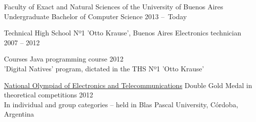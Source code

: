 \documentclass[10pt,a4paper]{article}
\begin{document}
\spacedhrule{0.3em}{-0.4em} %




\vspace{0.2em}
\headedsection
  { Faculty of Exact and Natural Sciences of the University of Buenos Aires }
  { \textsc{} } {%
  \headedsubsection
    { Undergraduate Bachelor of Computer Science }
    { 2013 --\ Today \ }{ }
}

\vspace{0.2em}
\headedsection
  { Technical High School Nº1 'Otto Krause', Buenos Aires }
  { \textsc{} } {%
  \headedsubsection
    { Electronics technician }
    { 2007 -- 2012 } {}
}


\vspace{0.2em}

\headedsection
  { Courses }
  { \textsc{} } {%
  \headedsubsection
    { Java programming course }
    { 2012 }{ \\ 'Digital Natives' program, dictated in the THS Nº1 'Otto Krause' }
}

\spacedhrule{0.8em}{-0.4em} %

\vspace{0.2em}
\headedsection
    { \href{}{National Olympiad of Electronics and Telecommunications} }
    { \textsc{} }{
    \headedsubsection
        { Double Gold Medal in theoretical competitions }
        { 2012 }
        { \\ In individual and group categories -- held in Blas Pascal University, Córdoba, Argentina }
}
\end{document}
